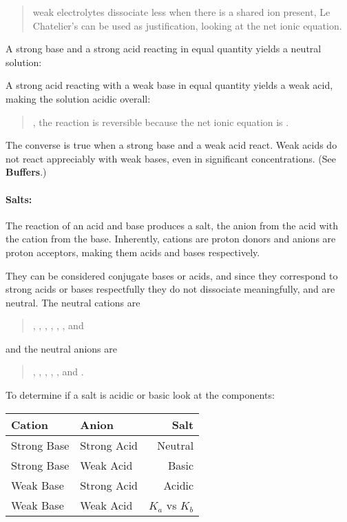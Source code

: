 \documentclass[]{article}
\let\oldparagraph\paragraph
\renewcommand{\paragraph}[1]{\oldparagraph{#1}\mbox{}}
\begin{document}
\begin{quote}
weak electrolytes dissociate less when there is a shared ion present, Le
Chatelier's can be used as justification, looking at the net ionic
equation.
\end{quote}

A strong base and a strong acid reacting in equal quantity yields a
neutral solution:

\begin{quote}
\end{quote}

A strong acid reacting with a weak base in equal quantity yields a weak
acid, making the solution acidic overall:

\begin{quote}
, the reaction is reversible
because the net ionic equation is .
\end{quote}

The converse is true when a strong base and a weak acid react. Weak
acids do not react appreciably with weak bases, even in significant
concentrations. (See \textbf{Buffers}.)

\paragraph{Salts:}\label{salts}

The reaction of an acid and base produces a salt, the anion from the
acid with the cation from the base. Inherently, cations are proton
donors and anions are proton acceptors, making them acids and bases
respectively.

They can be considered conjugate bases or acids, and since they
correspond to strong acids or bases respectfully they do not dissociate
meaningfully, and are neutral. The neutral cations are

\begin{quote}
, , , , , , and
\end{quote}

and the neutral anions are

\begin{quote}
, , , , , and .
\end{quote}

To determine if a salt is acidic or basic look at the components:

\begin{longtable}[]{@{}llr@{}}
\toprule
Cation & Anion & Salt\tabularnewline
\midrule
\endhead
Strong Base & Strong Acid & Neutral\tabularnewline
Strong Base & Weak Acid & Basic\tabularnewline
Weak Base & Strong Acid & Acidic\tabularnewline
Weak Base & Weak Acid & \(K_a\) vs \(K_b\)\tabularnewline
\bottomrule
\end{longtable}
\end{document}
